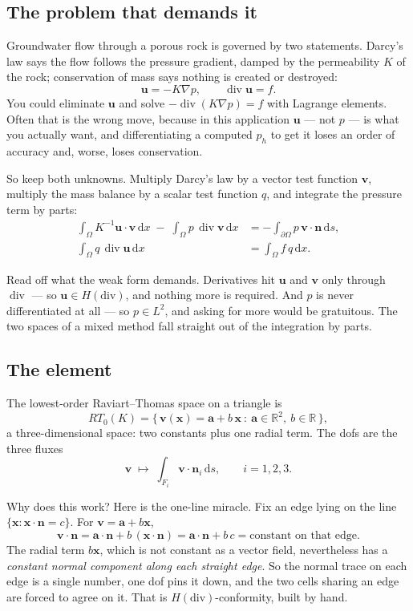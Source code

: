 \documentclass[11pt,a4paper]{article}
\newcommand{\Hdiv}{H(\mathrm{div})}
\newcommand{\dv}{\operatorname{div}}
\newcommand{\dx}{\,\mathrm{d}x}
\newcommand{\ds}{\,\mathrm{d}s}
\newcommand{\bn}{\mathbf{n}}
\newcommand{\bu}{\mathbf{u}}
\newcommand{\bv}{\mathbf{v}}
\newcommand{\bx}{\mathbf{x}}
\newcommand{\RR}{\mathbb{R}}
\begin{document}
\subsection{The problem that demands it}

Groundwater flow through a porous rock is governed by two statements. Darcy's
law says the flow follows the pressure gradient, damped by the permeability $K$
of the rock; conservation of mass says nothing is created or destroyed:
\[
  \bu = -K \nabla p, \qquad \dv \bu = f .
\]
You could eliminate $\bu$ and solve $-\dv(K\nabla p) = f$ with Lagrange
elements. Often that is the wrong move, because in this application $\bu$ ---
not $p$ --- is what you actually want, and differentiating a computed $p_h$ to
get it loses an order of accuracy and, worse, loses conservation.

So keep both unknowns. Multiply Darcy's law by a vector test function $\bv$,
multiply the mass balance by a scalar test function $q$, and integrate the
pressure term by parts:
\begin{equation}\label{eq:mixed}
\begin{aligned}
  \int_\Omega K^{-1} \bu \cdot \bv \dx \;-\; \int_\Omega p\, \dv \bv \dx
    &= -\int_{\partial\Omega} p\, \bv\cdot\bn \ds, \\
  \int_\Omega q\, \dv \bu \dx &= \int_\Omega f\, q \dx .
\end{aligned}
\end{equation}

Read off what the weak form demands. Derivatives hit $\bu$ and $\bv$ only
through $\dv$ --- so $\bu \in \Hdiv$, and nothing more is required. And $p$ is
never differentiated at all --- so $p \in L^2$, and asking for more would be
gratuitous. The two spaces of a mixed method fall straight out of the
integration by parts.

\subsection{The element}

The lowest-order Raviart--Thomas space on a triangle is
\[
  RT_0(K) = \Big\{\, \bv(\bx) = \mathbf{a} + b\,\bx \ :\
  \mathbf{a}\in\RR^2,\ b\in\RR \,\Big\},
\]
a three-dimensional space: two constants plus one radial term. The dofs are the
three fluxes
\[
  \bv \;\longmapsto\; \int_{F_i} \bv\cdot\bn_i \ds, \qquad i = 1,2,3 .
\]

Why does this work? Here is the one-line miracle. Fix an edge lying on the line
$\{\bx : \bx\cdot\bn = c\}$. For $\bv = \mathbf{a} + b\bx$,
\[
  \bv\cdot\bn = \mathbf{a}\cdot\bn + b\,(\bx\cdot\bn)
              = \mathbf{a}\cdot\bn + b\,c
              = \text{constant on that edge.}
\]
The radial term $b\bx$, which is not constant as a vector field, nevertheless
has a \emph{constant normal component along each straight edge}. So the normal
trace on each edge is a single number, one dof pins it down, and the two cells
sharing an edge are forced to agree on it. That is $\Hdiv$-conformity, built by
hand.
\end{document}
